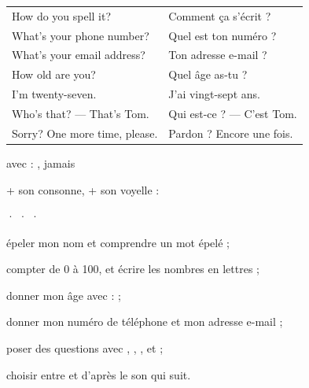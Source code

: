 \begin{essentiel}
\begin{minipage}[t]{0.56\linewidth}
\renewcommand{\arraystretch}{1.32}
\begin{tabular}{@{}>{\enOn\otSemi\fontsize{9.4}{11}\selectfont}l<{\enOff}@{\hspace{3mm}}>{\fontsize{9.2}{11}\selectfont\color{white!78!otNavy}}l@{}}
How do you spell it?          & Comment ça s'écrit ?\\
What's your phone number?     & Quel est ton numéro ?\\
What's your email address?    & Ton adresse e-mail ?\\
How old are you?              & Quel âge as-tu ?\\
I'm twenty-seven.             & J'ai vingt-sept ans.\\
Who's that? — That's Tom.     & Qui est-ce ? — C'est Tom.\\
Sorry? One more time, please. & Pardon ? Encore une fois.\\
\end{tabular}
\end{minipage}\hfill
\begin{minipage}[t]{0.38\linewidth}
{}
{\fontsize{9.2}{11.6}\selectfont avec  : , jamais \par}
{\fontsize{9.2}{11.6}\selectfont {} + son consonne,  + son voyelle :\par
{}\par}
{\fontsize{9.2}{11.6}\selectfont {}  ·   ·   ·  \par}
\end{minipage}
\end{essentiel}

\begin{jesais}
\item épeler mon nom et comprendre un mot épelé ;
\item compter de 0 à 100, et écrire les nombres en lettres ;
\item donner mon âge avec  :  ;
\item donner mon numéro de téléphone et mon adresse e-mail ;
\item poser des questions avec , , ,  et  ;
\item choisir entre  et  d'après le son qui suit.
\end{jesais}

